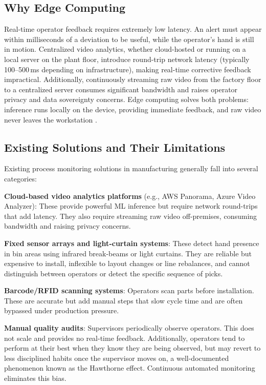 \documentclass[conference]{IEEEtran}
\begin{document}
\subsection{Why Edge Computing}
Real-time operator feedback requires extremely low latency. An alert must appear within milliseconds of a deviation to be useful, while the operator's hand is still in motion. Centralized video analytics, whether cloud-hosted or running on a local server on the plant floor, introduce round-trip network latency (typically 100--500\,ms depending on infrastructure), making real-time corrective feedback impractical. Additionally, continuously streaming raw video from the factory floor to a centralized server consumes significant bandwidth and raises operator privacy and data sovereignty concerns. Edge computing solves both problems: inference runs locally on the device, providing immediate feedback, and raw video never leaves the workstation \cite{b8, b9}.

\subsection{Existing Solutions and Their Limitations}
Existing process monitoring solutions in manufacturing generally fall into several categories:

\textbf{Cloud-based video analytics platforms} (e.g., AWS Panorama, Azure Video Analyzer): These provide powerful ML inference but require network round-trips that add latency. They also require streaming raw video off-premises, consuming bandwidth and raising privacy concerns.

\textbf{Fixed sensor arrays and light-curtain systems}: These detect hand presence in bin areas using infrared break-beams or light curtains. They are reliable but expensive to install, inflexible to layout changes or line rebalances, and cannot distinguish between operators or detect the specific sequence of picks.

\textbf{Barcode/RFID scanning systems}: Operators scan parts before installation. These are accurate but add manual steps that slow cycle time and are often bypassed under production pressure.

\textbf{Manual quality audits}: Supervisors periodically observe operators. This does not scale and provides no real-time feedback. Additionally, operators tend to perform at their best when they know they are being observed, but may revert to less disciplined habits once the supervisor moves on, a well-documented phenomenon known as the Hawthorne effect. Continuous automated monitoring eliminates this bias.
\end{document}
